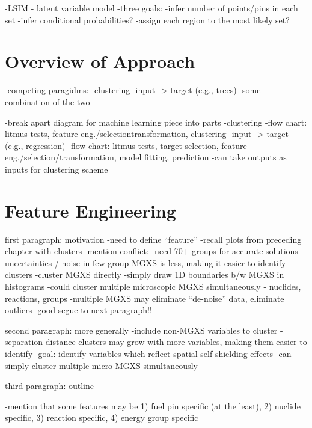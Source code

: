 -\ac{LSIM} - latent variable model
-three goals:
  -infer number of points/pins in each set
  -infer conditional probabilities?
  -assign each region to the most likely set?


\section{Overview of Approach}
\label{sec:chap10-overview}

-competing paragidms:
  -clustering
  -input -> target (e.g., trees)
  -some combination of the two

-break apart diagram for machine learning piece into parts
  -clustering
    -flow chart: litmus tests, feature eng./selectiontransformation, clustering
  -input -> target (e.g., regression)
    -flow chart: litmus tests, target selection, feature eng./selection/transformation, model fitting, prediction
     -can take outputs as inputs for clustering scheme


\section{Feature Engineering}
\label{sec:chap10-feature-engineer}

first paragraph: motivation
-need to define ``feature''
-recall plots from preceding chapter with clusters
-mention conflict:
  -need 70+ groups for accurate solutions
  -uncertainties / noise in few-group \ac{MGXS} is less, making it easier to identify clusters
-cluster \ac{MGXS} directly
  -simply draw 1D boundaries b/w \ac{MGXS} in histograms
  -could cluster multiple microscopic \ac{MGXS} simultaneously - nuclides, reactions, groups
  -multiple \ac{MGXS} may eliminate ``de-noise'' data, eliminate outliers
    -good segue to next paragraph!!

second paragraph: more generally
-include non-\ac{MGXS} variables to cluster
  -separation distance clusters may grow with more variables, making them easier to identify
-goal: identify variables which reflect spatial self-shielding effects
-can simply cluster multiple micro \ac{MGXS} simultaneously

third paragraph: outline
-

-mention that some features may be 1) fuel pin specific (at the least), 2) nuclide specific, 3) reaction specific, 4) energy group specific

